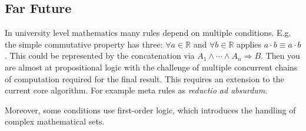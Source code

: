 \documentclass{scrartcl}
\theoremstyle{definition}
\begin{document}
\subsection{Far Future}

In university level mathematics many rules depend on multiple conditions.
E.g. the simple commutative property has three: $\forall a \in \mathbb{R}$ and $\forall b \in \mathbb{R}$ applies $a\cdot b \equiv a\cdot b$.
This could be represented by the concatenation via $A_1 \wedge \cdots \wedge A_n \Longrightarrow B$.
Then you are almost at propositional logic with the challenge of multiple concurrent chains of computation required for the final result.
This requires an extension to the current core algorithm. For example meta rules as \textit{reductio ad absurdum}.

Moreover, some conditions use first-order logic, which introduces the handling of complex mathematical sets.


\printbibliography
\end{document}
